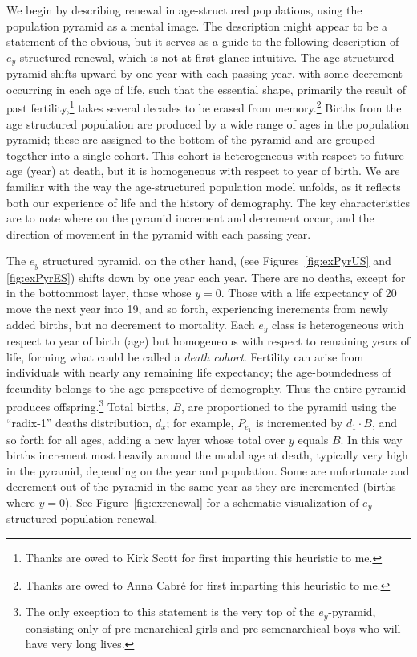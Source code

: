  \FloatBarrier
\label{sec:exrenewal}
We begin by describing renewal in age-structured populations, using the
population pyramid as a mental image. The description might appear to be a
statement of the obvious, but it serves as a guide to the following description of
$e_y$-structured renewal, which is not at first glance intuitive. The
age-structured pyramid shifts upward by one year with each passing year, with 
some decrement occurring in each age of life, such that the essential shape, 
primarily the result of past fertility,\footnote{Thanks are owed to Kirk Scott 
for first imparting this heuristic to me.} takes several decades to be erased 
from memory.\footnote{Thanks are owed to Anna Cabr\'{e} for
first imparting this heuristic to me.} Births from the age structured population 
are produced by a wide range of ages in the population pyramid; these
are assigned to the bottom of the pyramid and are grouped together into a single
cohort. This cohort is heterogeneous with respect to future age (year) at death, 
but it is homogeneous with respect to year of birth. We are familiar with
the way the age-structured population model unfolds, as it reflects both our
experience of life and the history of demography. The key characteristics are to
note where on the pyramid increment and decrement occur, and the direction of
movement in the pyramid with each passing year.

The $e_y$ structured pyramid, on the other hand, (see Figures~\ref{fig:exPyrUS}
and \ref{fig:exPyrES}) shifts down by one year each year. There are no deaths,
except for in the bottommost layer, those whose $y = 0$. Those with a life
expectancy of 20 move the next year into 19, and so forth, experiencing
increments from newly added births, but no decrement to mortality. 
Each $e_y$ class is heterogeneous with 
respect to year of birth (age) but homogeneous with respect to remaining 
years of life, forming what could be called a \textit{death cohort}. Fertility
can arise from individuals with nearly any remaining life expectancy; the 
age-boundedness of fecundity belongs to the age
perspective of demography. Thus the entire pyramid produces 
offspring.\footnote{The only exception
to this statement is the very top of the $e_y$-pyramid, consisting only of
pre-menarchical girls and pre-semenarchical boys who will have very long
lives.} Total births, $B$, are proportioned to the pyramid using the ``radix-1''
deaths distribution, $d_x$; for example, $P_{e_1}$ is incremented by $d_1 \cdot
B$, and so forth for all ages, adding a new layer whose total over $y$ equals $B$. In 
this way births
increment most heavily around the modal age at death, typically very high in the
pyramid, depending on the year and population. Some are
unfortunate and decrement out of the pyramid in the same year as they are
incremented (births where $y = 0$). See Figure~\ref{fig:exrenewal} for a
schematic visualization of $e_y$-structured population renewal.

